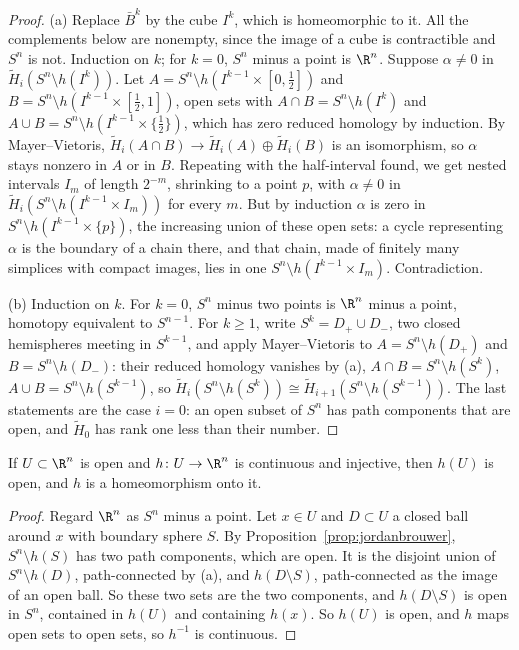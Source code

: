 \begin{proof}
(a) Replace $\bar B^k$ by the cube $I^k$, which is homeomorphic to it. All the complements below are nonempty, since the image of a cube is contractible and $S^n$ is not. Induction on $k$; for $k=0$, $S^n$ minus a point is $\R^n$. Suppose $\alpha\ne0$ in $\tilde H_i(S^n\setminus h(I^k))$. Let
$A=S^n\setminus h(I^{k-1}\times[0,\frac12])$ and $B=S^n\setminus h(I^{k-1}\times[\frac12,1])$, open sets with $A\cap B=S^n\setminus h(I^k)$ and $A\cup B=S^n\setminus h(I^{k-1}\times\{\frac12\})$, which has zero reduced homology by
induction. By Mayer--Vietoris, $\tilde H_i(A\cap B)\to\tilde H_i(A)\oplus\tilde H_i(B)$ is an isomorphism, so $\alpha$ stays nonzero in $A$ or in $B$. Repeating with the half-interval found, we get nested intervals
$I_m$ of length $2^{-m}$, shrinking to a point $p$, with $\alpha\ne0$ in $\tilde H_i(S^n\setminus h(I^{k-1}\times I_m))$ for every $m$. But by induction $\alpha$ is zero in $S^n\setminus h(I^{k-1}\times\{p\})$, the increasing union of
these open sets: a cycle representing $\alpha$ is the boundary of a chain there, and that chain, made of
finitely many simplices with compact images, lies in one $S^n\setminus h(I^{k-1}\times I_m)$. Contradiction.

(b) Induction on $k$. For $k=0$, $S^n$ minus two points is $\R^n$ minus a point, homotopy equivalent to $S^{n-1}$. For $k\ge1$, write $S^k=D_+\cup D_-$, two closed hemispheres meeting in $S^{k-1}$, and apply
Mayer--Vietoris to $A=S^n\setminus h(D_+)$ and $B=S^n\setminus h(D_-)$: their reduced homology vanishes by (a), $A\cap B=S^n\setminus h(S^k)$, $A\cup B=S^n\setminus h(S^{k-1})$, so
$\tilde H_i(S^n\setminus h(S^k))\cong\tilde H_{i+1}(S^n\setminus h(S^{k-1}))$. The last statements are the case $i=0$: an open subset of $S^n$ has path components that are open, and $\tilde H_0$ has rank one less than their number.
\end{proof}

\begin{theorem}\label{thm:invariancedomain}
If $U\subset\R^n$ is open and $h\colon U\to\R^n$ is continuous and injective, then $h(U)$ is open, and $h$ is a homeomorphism onto it.
\end{theorem}

\begin{proof}
Regard $\R^n$ as $S^n$ minus a point. Let $x\in U$ and $D\subset U$ a closed ball around $x$ with boundary sphere $S$. By Proposition~\ref{prop:jordanbrouwer}, $S^n\setminus h(S)$ has two path components, which are open.
It is the disjoint union of $S^n\setminus h(D)$, path-connected by (a), and $h(D\setminus S)$, path-connected as the image of an open ball. So these two sets are the two components, and $h(D\setminus S)$ is
open in $S^n$, contained in $h(U)$ and containing $h(x)$. So $h(U)$ is open, and $h$ maps open sets to open sets, so $h^{-1}$ is continuous.
\end{proof}

